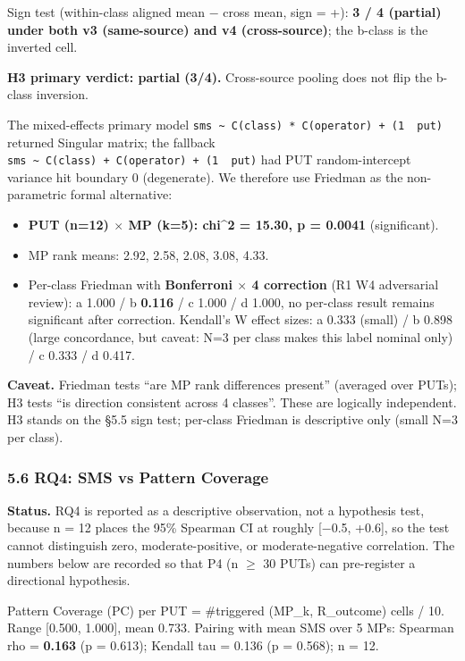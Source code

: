 \documentclass[review,12pt,authoryear]{elsarticle}
\providecommand{\tightlist}{\setlength{\itemsep}{0pt}\setlength{\parskip}{0pt}}
\begin{document}
Sign test (within-class aligned mean − cross mean, sign = +): \textbf{3
/ 4 (partial) under both v3 (same-source) and v4 (cross-source)}; the
b-class is the inverted cell.

\textbf{H3 primary verdict: partial (3/4).} Cross-source pooling does
not flip the b-class inversion.

The mixed-effects primary model
\texttt{sms\ \textasciitilde{}\ C(class)\ *\ C(operator)\ +\ (1\ \textbar{}\ put)}
returned Singular matrix; the fallback
\texttt{sms\ \textasciitilde{}\ C(class)\ +\ C(operator)\ +\ (1\ \textbar{}\ put)}
had PUT random-intercept variance hit boundary 0 (degenerate). We
therefore use Friedman as the non-parametric formal alternative:

\begin{itemize}
\tightlist
\item
  \textbf{PUT (n=12) $\times$ MP (k=5): chi\^{}2 = 15.30, p = 0.0041}
  (significant).
\item
  MP rank means: 2.92, 2.58, 2.08, 3.08, 4.33.
\item
  Per-class Friedman with \textbf{Bonferroni $\times$ 4 correction} (R1 W4
  adversarial review): a 1.000 / b \textbf{0.116} / c 1.000 / d 1.000, no per-class
  result remains significant after correction. Kendall's W effect sizes:
  a 0.333 (small) / b 0.898 (large concordance, but caveat: N=3 per
  class makes this label nominal only) / c 0.333 / d 0.417.
\end{itemize}

\textbf{Caveat.} Friedman tests ``are MP rank differences present''
(averaged over PUTs); H3 tests ``is direction consistent across 4
classes''. These are logically independent. H3 stands on the §5.5 sign
test; per-class Friedman is descriptive only (small N=3 per class).

\subsubsection{5.6 RQ4: SMS vs Pattern Coverage}\label{rq4-sms-vs-pattern-coverage}

\textbf{Status.} RQ4 is reported as a descriptive observation, not a
hypothesis test, because n = 12 places the 95\% Spearman CI at roughly
{[}−0.5, +0.6{]}, so the test cannot distinguish zero,
moderate-positive, or moderate-negative correlation. The numbers below
are recorded so that P4 (n $\geq$ 30 PUTs) can pre-register a directional
hypothesis.

Pattern Coverage (PC) per PUT = \#triggered (MP\_k, R\_outcome) cells /
10. Range {[}0.500, 1.000{]}, mean 0.733. Pairing with mean SMS over 5
MPs: Spearman rho = \textbf{0.163} (p = 0.613); Kendall tau = 0.136 (p =
0.568); n = 12.
\end{document}
